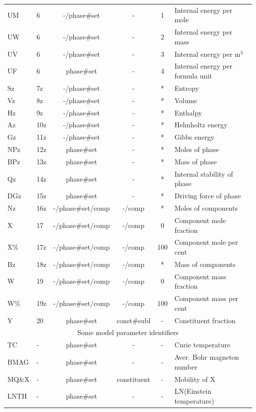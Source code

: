 \documentclass[11pt]{article}
\begin{document}
\begin{table}[!ht]
{\begin{tabular}{|llcccl|}
UM     & 6 & -/phase\#set & -         & 1 & Internal energy per mole\\
UW     & 6 & -/phase\#set & -         & 2 & Internal energy per mass\\
UV     & 6 & -/phase\#set & -         & 3 & Internal energy per m$^3$\\
UF     & 6 & phase\#set   & -         & 4 & Internal energy per formula unit\\
Sz     & 7z & -/phase\#set & -            & * & Entropy\\
Vz     & 8z & -/phase\#set & -            & * & Volume\\
Hz     & 9z & -/phase\#set & -            & * & Enthalpy\\
Az     & 10z & -/phase\#set & -           & * & Helmholtz energy\\
Gz     & 11z & -/phase\#set & -           & * & Gibbs energy\\
NPz    & 12z &  phase\#set & -            & * & Moles of phase\\
BPz    & 13z & phase\#set & -             & * & Mass of phase\\
Qz     & 14z & phase\#set & -             & * & Internal stability of phase\\
DGz    & 15z & phase\#set & -             & * & Driving force of phase\\
Nz     & 16z & -/phase\#set/comp & -/comp & * & Moles of components\\
X      & 17 & -/phase\#set/comp  & -/comp & 0  & Component mole fraction\\
X\%    & 17z & -/phase\#set/comp & -/comp & 100 & Component mole per cent\\
Bz     & 18z & -/phase\#set/comp & -/comp & *  & Mass of components\\
W      & 19 & -/phase\#set/comp  & -/comp & 0 & Component mass fraction\\
W\%    & 19z & -/phase\#set/comp & -/comp & 100 & Component mass per cent\\
Y      & 20 & phase\#set & const\#subl    & - & Constituent fraction\\\hline
\multicolumn{6}{|c|}{Some model parameter identifiers}\\\hline
TC     & - & phase\#set & -               & - & Curie temperature\\
BMAG   & - & phase\#set & -               & - & Aver. Bohr magneton number\\
MQ\&X  & - & phase\#set & constituent     & - & Mobility of X\\
LNTH   & - & phase\#set & -               & - & LN(Einstein temperature)\\\hline
\end{tabular}
}
\end{table}
\end{document}
